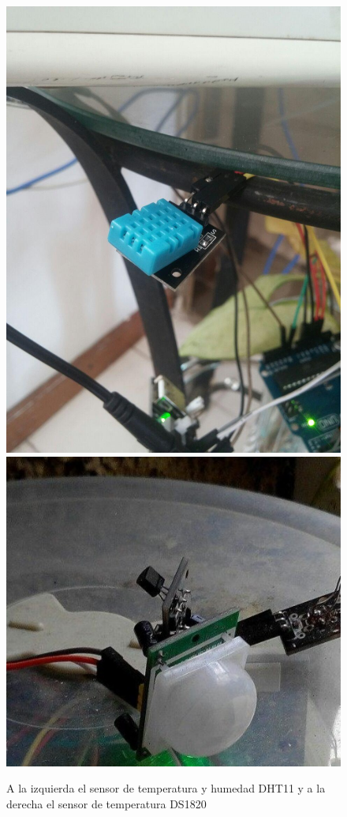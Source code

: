 \begin{itemize}
\begin{figure}[htb]
\centering
\includegraphics[scale=0.18]{./Figuras/temp_ext.jpg}
\includegraphics[scale=0.38]{./Figuras/ds1820.jpg}
\caption{A la izquierda el sensor de temperatura y humedad DHT11 y a la derecha el sensor de temperatura DS1820}
\label{fig:sensores_temp}
\vspace*{-10pt}
\end{figure}


\end{itemize}
